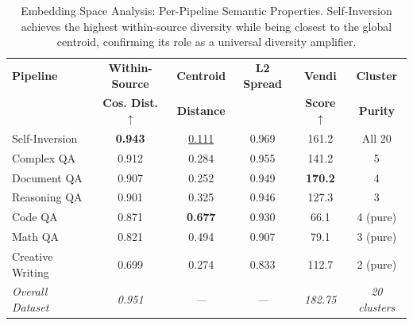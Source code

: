 \begin{table}[t]
\centering
\caption{Embedding Space Analysis: Per-Pipeline Semantic Properties. Self-Inversion achieves the highest within-source diversity while being closest to the global centroid, confirming its role as a universal diversity amplifier.}
\label{tab:embedding_analysis}
\begin{tabular}{lccccc}
\toprule
\textbf{Pipeline} & \textbf{Within-Source} & \textbf{Centroid} & \textbf{L2 Spread} & \textbf{Vendi} & \textbf{Cluster} \\
 & \textbf{Cos. Dist.} $\uparrow$ & \textbf{Distance} & & \textbf{Score} $\uparrow$ & \textbf{Purity} \\
\midrule
Self-Inversion & \textbf{0.943} & \underline{0.111} & 0.969 & 161.2 & All 20 \\
Complex QA & 0.912 & 0.284 & 0.955 & 141.2 & 5 \\
Document QA & 0.907 & 0.252 & 0.949 & \textbf{170.2} & 4 \\
Reasoning QA & 0.901 & 0.325 & 0.946 & 127.3 & 3 \\
Code QA & 0.871 & \textbf{0.677} & 0.930 & 66.1 & 4 (pure) \\
Math QA & 0.821 & 0.494 & 0.907 & 79.1 & 3 (pure) \\
Creative Writing & 0.699 & 0.274 & 0.833 & 112.7 & 2 (pure) \\
\midrule
\textit{Overall Dataset} & \textit{0.951} & \textit{---} & \textit{---} & \textit{182.75} & \textit{20 clusters} \\
\bottomrule
\end{tabular}
\vspace{-2mm}
\end{table}
